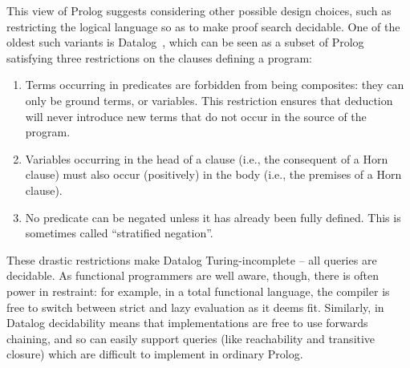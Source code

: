 
This view of Prolog suggests considering other possible design
choices, such as restricting the logical language so as to make proof
search decidable. One of the oldest such variants is
Datalog~\cite{datalog}, which can be seen as a subset of Prolog
satisfying three restrictions on the clauses defining a program:

\begin{enumerate}
\item Terms occurring in predicates are forbidden from being
  composites: they can only be ground terms, or variables. This
  restriction ensures that deduction will never introduce new terms
  that do not occur in the source of the program.

\item Variables occurring in the head of a clause (i.e., the
  consequent of a Horn clause) must also occur (positively) in the
  body (i.e., the premises of a Horn clause).

\item No predicate can be negated unless it has already been fully
  defined.  This is sometimes called ``stratified negation''.
\end{enumerate}

These drastic restrictions make Datalog Turing-incomplete -- all
queries are decidable. As functional programmers are well aware,
though, there is often power in restraint: for example, in a total
functional language, the compiler is free to switch between strict and
lazy evaluation as it deems fit. Similarly, in Datalog decidability
means that implementations are free to use forwards chaining, and so
can easily support queries (like reachability and transitive closure)
which are difficult to implement in ordinary Prolog.

%

